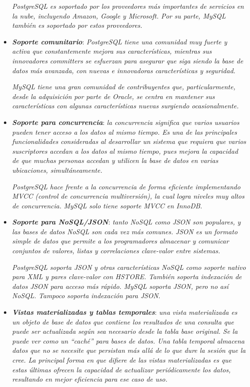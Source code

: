\documentclass[11pt,oneside]{book}
\begin{document}
\begin{itemize}
\textit{PostgreSQL es soportado por los proveedores más importantes de servicios en la nube, incluyendo Amazon, Google y Microsoft. Por su parte, MySQL también es soportado por estos proveedores.}

\item \textit{\textbf{Soporte comunitario}}: \textit{PostgreSQL tiene una comunidad muy fuerte y activa que constantemente mejora sus características, mientras sus innovadores committers se esfuerzan para asegurar que siga siendo la base de datos más avanzada, con nuevas e innovadoras características y seguridad.}
	
\textit{MySQL tiene una gran comunidad de contribuyentes que, particularmente, desde la adquisición por parte de Oracle, se centra en mantener sus características con algunas características nuevas surgiendo ocasionalmente.}

\item \textit{\textbf{Soporte para concurrencia}}: \textit{la concurrencia significa que varios usuarios pueden tener acceso a los datos al mismo tiempo. Es una de las principales funcionalidades consideradas al desarrollar un sistema que requiera que varios suscriptores accedan a los datos al mismo tiempo, pues mejora la capacidad de que muchas personas accedan y utilicen la base de datos en varias ubicaciones, simultáneamente.}

\textit{PostgreSQL hace frente a la concurrencia de forma eficiente implementando MVCC (control de concurrencia multiversión), la cual logra niveles muy altos de concurrencia. MySQL solo tiene soporte MVCC en InnoDB.}

\item \textit{\textbf{Soporte para NoSQL/JSON}}: \textit{tanto NoSQL como JSON son populares, y las bases de datos NoSQL son cada vez más comunes. JSON es un formato simple de datos que permite a los programadores almacenar y comunicar conjuntos de valores, listas y correlaciones clave-valor entre sistemas.}

\textit{PostgreSQL soporta JSON y otras características NoSQL como soporte nativo para XML y pares clave-valor con HSTORE. También soporta indexación de datos JSON para acceso más rápido. MySQL soporta JSON, pero no así NoSQL. Tampoco soporta indexación para JSON.}

\item \textit{\textbf{Vistas materializadas y tablas temporales}}: \textit{una vista materializada es un objeto de base de datos que contiene los resultados de una consulta que puede ser actualizada según sea necesario desde la tabla base original. Se la puede ver como un ``caché'' para bases de datos. Una tabla temporal almacena datos que no se necesite que persistan más allá de lo que dure la sesión que la cree. La principal forma en que difiere de las vistas materializadas es que estas últimas ofrecen la capacidad de actualizar periódicamente los datos, resultando en mejor eficiencia para ese caso de uso.}


\end{itemize}
\end{document}
